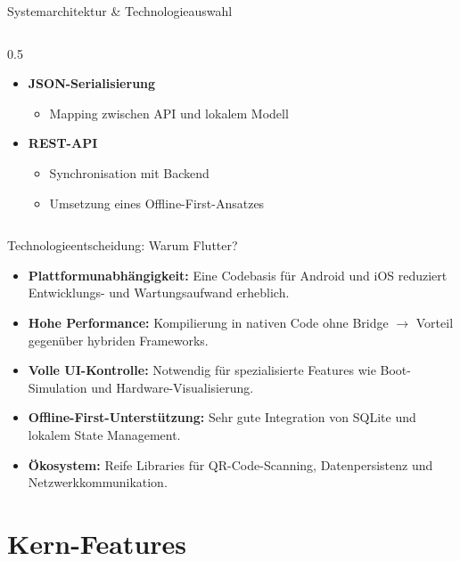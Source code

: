 \documentclass[10pt]{beamer}
\begin{document}
\begin{frame}{Systemarchitektur \& Technologieauswahl}
\begin{columns}[T]
\begin{column}{0.5\textwidth}
\begin{itemize}
                \item \textbf{JSON-Serialisierung}
                \begin{itemize}
                    \item Mapping zwischen API und lokalem Modell
                \end{itemize}
                
                \item \textbf{REST-API}
                \begin{itemize}
                    \item Synchronisation mit Backend
                    \item Umsetzung eines Offline-First-Ansatzes
                \end{itemize}
            \end{itemize}
        \end{column}
    \end{columns}
\end{frame}


\begin{frame}{Technologieentscheidung: Warum Flutter?}
    \begin{itemize}
        \item \textbf{Plattformunabhängigkeit:}
        Eine Codebasis für Android und iOS reduziert Entwicklungs- und Wartungsaufwand erheblich.
        
        \item \textbf{Hohe Performance:}
        Kompilierung in nativen Code ohne Bridge $\rightarrow$ Vorteil gegenüber hybriden Frameworks.
        
        \item \textbf{Volle UI-Kontrolle:}
        Notwendig für spezialisierte Features wie Boot-Simulation und Hardware-Visualisierung.
        
        \item \textbf{Offline-First-Unterstützung:}
        Sehr gute Integration von SQLite und lokalem State Management.
        
        \item \textbf{Ökosystem:}
        Reife Libraries für QR-Code-Scanning, Datenpersistenz und Netzwerkkommunikation.
    \end{itemize}
\end{frame}

\section{Kern-Features}
\end{document}
